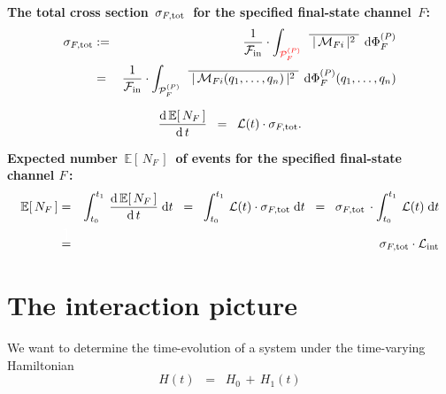 \vskip 0.2cm
\noindent
\textbf{The total cross section \,$\sigma_{F,\textnormal{tot}}$\, for the specified final-state channel \,$F$:}
\begin{eqnarray*}
\sigma_{F,\textnormal{tot}}
& := &
    \dfrac{1}{\mathcal{F}_{\textnormal{in}}}
    \cdot
    \int_{ {\color{red}\mathcal{P}_{F}^{(P)}} }\;\,
        \overline{{\color{white}.}\vert\,\mathcal{M}_{Fi}\,\vert^{2}{\color{white}.}}
        \;\,\d\Phi_{F}^{(P)}
\\
& = &
    \dfrac{1}{\mathcal{F}_{\textnormal{in}}}
    \cdot
    \int_{ {\color{black}\mathcal{P}_{F}^{(P)}} }\;\,
        \overline{{\color{white}.}\vert\,\mathcal{M}_{Fi}(q_{1},\ldots,q_{n})\,\vert^{2}{\color{white}.}}
        \;\,\d\Phi_{F}^{(P)}(q_{1},\ldots,q_{n})
\end{eqnarray*}

\vskip 0.2cm
\noindent
\begin{equation*}
\dfrac{\textnormal{d}\,\mathbb{E}[\,N_{F}\,]}{\textnormal{d}\,t}
\;\; = \;\;
    \mathcal{L}(t) \cdot \sigma_{F,\mathrm{tot}}.
\end{equation*}

\vskip 0.2cm
\noindent
\textbf{Expected number \,$\mathbb{E}[\,N_{F}\,]$\, of events for the specified final-state channel $F$\,:}
\begin{eqnarray*}
\mathbb{E}[\,N_{F}\,]
& = &
    \displaystyle
    \int_{t_{0}}^{t_{1}}\,
        \dfrac{\d\,\mathbb{E}[\,N_{F}\,]}{\d\,t}
        \;\d t
\;\; = \;\;
    \displaystyle
    \int_{t_{0}}^{t_{1}}\,
        \mathcal{L}(t)\cdot\sigma_{F,\mathrm{tot}}
        \;\d t
\;\; = \;\;
    \sigma_{F,\mathrm{tot}}
    \,\cdot
    \displaystyle
    \int_{t_{0}}^{t_{1}}\,
        \mathcal{L}(t)
        \;\d t
\\
& \overset{{\color{white}\textnormal{\Large1}}}{=} &
    \sigma_{F,\mathrm{tot}}
    \cdot
    \mathcal{L}_{\textnormal{int}}
\end{eqnarray*}


\vskip 0.5cm
\section{The interaction picture}


We want to determine the time-evolution of a system under the time-varying Hamiltonian
\begin{equation*}
H(t) \;\; = \;\; H_{0} \,+\, H_{1}(t)
\end{equation*}

